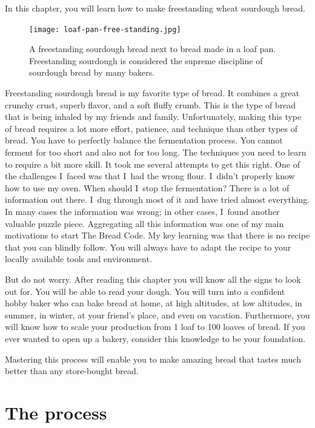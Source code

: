 \begin{quoting}
In this chapter, you will learn how to make
freestanding wheat sourdough bread.
\end{quoting}

\begin{figure}[!htb]
  \texttt{[image: loaf-pan-free-standing.jpg]}
  \caption[Freestanding and loaf pan bread]{A freestanding sourdough bread
      next to bread made in a loaf pan.  Freestanding sourdough is considered
      the supreme discipline of sourdough bread by many bakers.}
\end{figure}

Freestanding sourdough bread is my favorite
type of bread. It combines a great crunchy crust, superb
flavor, and a soft fluffy crumb. This is the type of bread
that is being inhaled by my friends and family. Unfortunately,
making this type of bread requires a lot more effort, patience,
and technique than other types of bread. You have to perfectly
balance the fermentation process. You cannot ferment for too
short and also not for too long. The techniques you need to
learn to require a bit more skill. It took me several attempts
to get this right. One of the challenges I~faced was that
I~had the wrong flour. I~didn't properly know how to use my oven.
When should I~stop the fermentation? There is a lot of information
out there. I~dug through most of it and have tried almost everything.
In many cases the information was wrong; in other cases, I~found another
valuable puzzle piece. Aggregating all this
information was one of my main motivations to start The Bread Code.
My key learning was that there is no recipe that
you can blindly follow. You will always have to adapt the recipe
to your locally available tools and environment.

But do not worry. After reading this chapter you will know
all the signs to look out for. You will be able to read your dough.
You will turn into a confident hobby baker who can bake bread
at home, at high altitudes, at low altitudes, in summer, in winter,
at your friend's place, and even on vacation. Furthermore,
you will know how to scale your production from 1 loaf to 100 loaves of bread.
If you ever wanted to open up a bakery, consider this knowledge to
be your foundation.

Mastering this process will enable you to make amazing bread
that tastes much better than any store-bought bread.

\section{The process}

